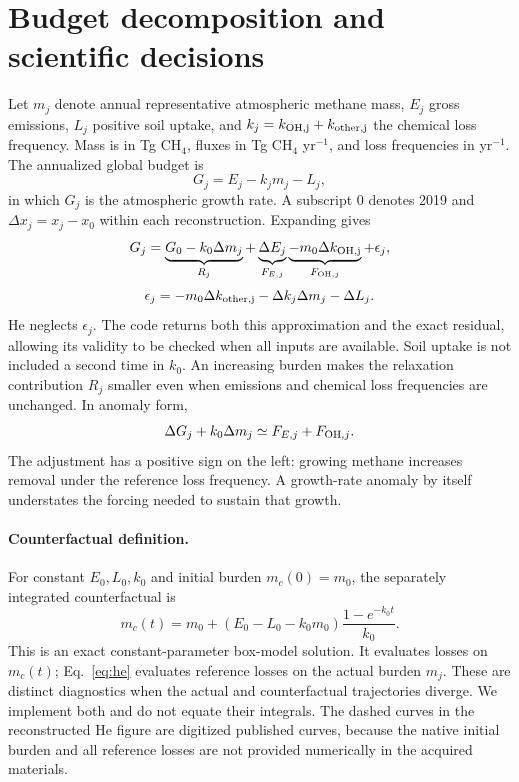 \documentclass[11pt]{article}
\begin{document}
\section{Budget decomposition and scientific decisions}
Let $m_j$ denote annual representative atmospheric methane mass, $E_j$ gross
emissions, $L_j$ positive soil uptake, and $k_j=k_{\rm OH,j}+k_{\rm other,j}$
the chemical loss frequency. Mass is in Tg CH$_4$, fluxes in Tg CH$_4$
yr$^{-1}$, and loss frequencies in yr$^{-1}$. The annualized global budget is
\begin{equation}\label{eq:budget}
G_j=E_j-k_jm_j-L_j,
\end{equation}
in which $G_j$ is the atmospheric growth rate. A subscript 0 denotes 2019
and $\Delta x_j=x_j-x_0$ within each reconstruction. Expanding gives
\begin{equation}\label{eq:he}
G_j=\underbrace{G_0-k_0\Delta m_j}_{R_j}
 +\underbrace{\Delta E_j}_{F_{E,j}}
 \underbrace{-m_0\Delta k_{\rm OH,j}}_{F_{{\rm OH},j}}
 +\epsilon_j,
\end{equation}
\begin{equation}\label{eq:residual}
\epsilon_j=-m_0\Delta k_{\rm other,j}
 -\Delta k_j\Delta m_j-\Delta L_j.
\end{equation}
He neglects $\epsilon_j$. The code returns both this approximation and the
exact residual, allowing its validity to be checked when all inputs are
available. Soil uptake is not included a second time in $k_0$.
An increasing burden makes the relaxation contribution $R_j$ smaller even
when emissions and chemical loss frequencies are unchanged. In anomaly form,
\begin{equation}\label{eq:adjust}
\Delta G_j+k_0\Delta m_j\simeq F_{E,j}+F_{{\rm OH},j}.
\end{equation}
The adjustment has a positive sign on the left: growing methane increases
removal under the reference loss frequency. A growth-rate anomaly by itself
understates the forcing needed to sustain that growth.

\paragraph{Counterfactual definition.}
For constant $E_0,L_0,k_0$ and initial burden $m_c(0)=m_0$, the separately
integrated counterfactual is
\begin{equation}\label{eq:counter}
m_c(t)=m_0+(E_0-L_0-k_0m_0)\frac{1-e^{-k_0t}}{k_0}.
\end{equation}
This is an exact constant-parameter box-model solution. It evaluates losses
on $m_c(t)$; Eq.~\ref{eq:he} evaluates reference losses on the actual burden
$m_j$. These are distinct diagnostics when the actual and counterfactual
trajectories diverge. We implement both and do not equate their integrals.
The dashed curves in the reconstructed He figure are digitized published
curves, because the native initial burden and all reference losses are not
provided numerically in the acquired materials.
\end{document}
